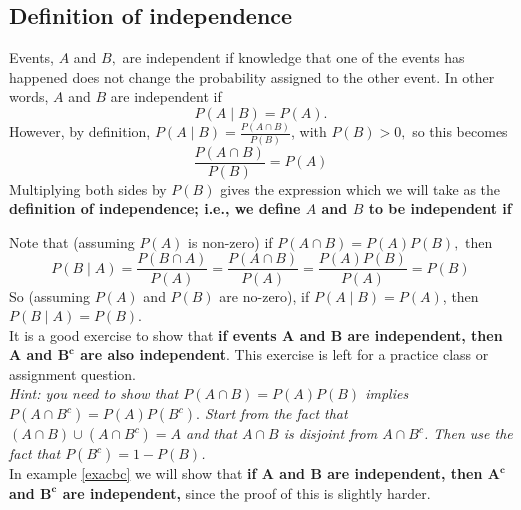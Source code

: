 \subsection{Definition of independence} \label{definition of independence}
Events, $A$ and $B,$ are independent if knowledge that one of the events has happened does not change the probability assigned to the other event. In other words, $A$ and $B$ are independent if
\[
P(A \! \mid \! B) = P(A).
\]
However, by definition, $P(A \! \mid \! B) = \frac{P(A \cap B)}{P(B)}$, with $P(B) > 0,$ so this becomes
\[
\frac{P(A \cap B)}{P(B)} = P(A)
\]
Multiplying both sides by $P(B)$ gives the expression which we will take as the \textbf{definition of independence; i.e., we define $A$ and $B$ to be independent if}

\bigskip
\hfil{}
\bigskip

\noindent Note that (assuming $P(A)$ is non-zero) if $P(A \cap B) = P(A)P(B),$ then 
\[
P(B \! \mid \! A) = \frac{P(B \cap A)}{P(A)} = \frac{P(A \cap B)}{P(A)} = \frac{P(A)P(B)}{P(A)} = P(B) 
\]
So (assuming $P(A)$ and $P(B)$ are no-zero), if $P(A \! \mid \! B) = P(A)$, then $P(B \! \mid \! A) = P(B)$. \\

\noindent It is a good exercise to show that \textbf{if events $\boldsymbol{A}$ and $\boldsymbol{B}$ are independent, then $\boldsymbol{A}$ and $\boldsymbol{B^c}$ are also independent}. This exercise is left for a practice class or assignment question. \\
\textit{Hint: you need to show that $\mathit{P(A \cap B) = P(A)P(B)}$ implies $\mathit{P(A \cap B^c) = P(A)P(B^c).}$ Start from the fact that $(A \cap B) \cup (A \cap B^c) = A$ and that $A \cap B$ is disjoint from $A \cap B^c$. Then use the fact that $P(B^c) = 1 - P(B)$.} \\

\noindent In example \ref{exacbc} we will show that \textbf{if $\boldsymbol{A}$ and $\boldsymbol{B}$ are independent, then $\boldsymbol{A^c}$ and $\boldsymbol{B^c}$ are independent,} since the proof of this is slightly harder.

